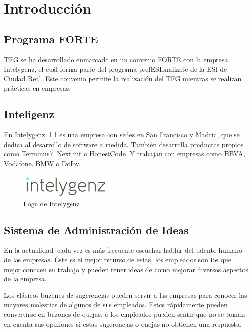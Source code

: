 \chapter{Introducción}

\section{Programa FORTE}

 \acf{TFG} se ha desarrollado enmarcado en un convenio \acf{FORTE} con la empresa Intelygenz, el cuál forma parte del programa prefESIonalizate de la \acf{ESI} de Ciudad Real. Este
convenio permite la realización del TFG mientras se realizan prácticas en empresas.

\section{Inteligenz}

En Intelygenz~\ref{fig:intelygenz} es una empresa con sedes en San Francisco y Madrid, que se dedica al desarrollo de software a medida.  También 
desarrolla productos propios como Terminus7, Nextinit o HonestCode. Y trabajan con empresas como BBVA, Vodafone, BMW o Dolby. 

\begin{figure}[!h]
	\begin{center}
		\includegraphics[width=0.4\textwidth]{./img/introduccion/intelygenz.jpg}
		\caption{Logo de Intelygenz}
		\label{fig:intelygenz}
	\end{center}
\end{figure}

\section{Sistema de Administración de Ideas}
En  la actualidad, cada vez es más frecuente escuchar hablar del talento humano de las empresas. Éste es el mejor recurso de estas,
 los empleados son los que mejor conocen su trabajo y pueden tener ideas de como mejorar diversos aspectos de la empresa. 
 
 Los clásicos buzones de sugerencias pueden servir a las empresas para conocer las mayores molestias de
  algunos de sus empleados. Estos rápidamente pueden convertirse en buzones de quejas, o los empleados pueden
   sentir que no se toman en cuenta sus opiniones si estas  sugerencias o quejas no obtienen una respuesta.
 
